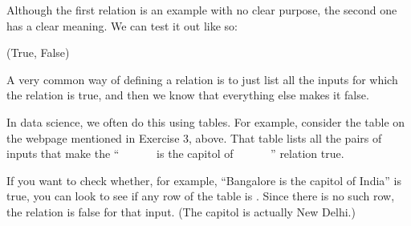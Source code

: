 \documentclass[letterpaper,10pt,english]{sphinxmanual}
\begin{document}
\begin{sphinxVerbatim}[commandchars=\\\{\}]
     
       \PYG{p}{[}\PYG{p}{]}

    
       \PYG{p}{[}\PYG{p}{]}
\end{sphinxVerbatim}

Although the first relation is an example with no clear purpose, the second one has a clear meaning.  We can test it out like so:

\begin{sphinxVerbatim}[commandchars=\\\{\}]
     
\end{sphinxVerbatim}

\begin{sphinxVerbatim}[commandchars=\\\{\}]
(True, False)
\end{sphinxVerbatim}

 A very common way of defining a relation is to just list all the inputs for which the relation is true, and then we know that everything else makes it false.

In data science, we often do this using tables.  For example, consider the table on the webpage mentioned in Exercise 3, above.  That table lists all the pairs of inputs that make the “        is the capitol of        ” relation true.

If you want to check whether, for example, “Bangalore is the capitol of India” is true, you can look to see if any row of the table is .  Since there is no such row, the relation is false for that input.  (The capitol is actually New Delhi.)
\end{document}
